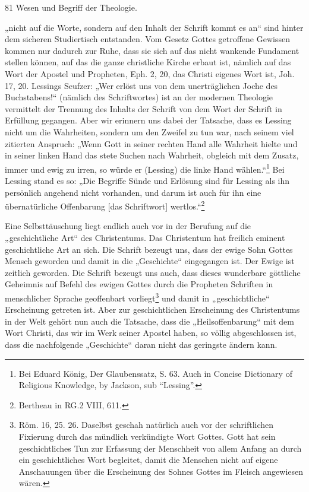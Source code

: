 81 Wesen und Begriff der Theologie.\par „nicht auf die Worte, sondern auf den Inhalt der Schrift kommt es an“ sind hinter dem sicheren Studiertisch entstanden. Vom Gesetz Gottes getroffene Gewissen kommen nur dadurch zur Ruhe, dass sie sich auf das nicht wankende Fundament stellen können, auf das die ganze christliche Kirche erbaut ist, nämlich auf das Wort der Apostel und Propheten, Eph. 2, 20, das Christi eigenes Wort ist, Joh. 17, 20. Lessings Seufzer: „Wer erlöst uns von dem unerträglichen Joche des Buchstabens!“ (nämlich des Schriftwortes) ist an der modernen Theologie vermittelt der Trennung des Inhalts der Schrift von dem Wort der Schrift in Erfüllung gegangen. Aber wir erinnern uns dabei der Tatsache, dass es Lessing nicht um die Wahrheiten, sondern um den Zweifel zu tun war, nach seinem viel zitierten Anspruch: „Wenn Gott in seiner rechten Hand alle Wahrheit hielte und in seiner linken Hand das stete Suchen nach Wahrheit, obgleich mit dem Zusatz, immer und ewig zu irren, so würde er (Lessing) die linke Hand wählen.“\footnote[267]{Bei Eduard König, Der Glaubenssatz, S. 63. Auch in Concise Dictionary of Religious Knowledge, by Jackson, sub “Lessing”.} Bei Lessing stand es so: „Die Begriffe Sünde und Erlösung sind für Lessing als ihn persönlich angehend nicht vorhanden, und darum ist auch für ihn eine übernatürliche Offenbarung [das Schriftwort] wertlos.“\footnote[268]{Bertheau in RG.2 VIII, 611.}\par Eine Selbsttäuschung liegt endlich auch vor in der Berufung auf die „geschichtliche Art“ des Christentums. Das Christentum hat freilich eminent geschichtliche Art an sich. Die Schrift bezeugt uns, dass der ewige Sohn Gottes Mensch geworden und damit in die „Geschichte“ eingegangen ist. Der Ewige ist zeitlich geworden. Die Schrift bezeugt uns auch, dass dieses wunderbare göttliche Geheimnis auf Befehl des ewigen Gottes durch die Propheten Schriften in menschlicher Sprache geoffenbart vorliegt\footnote[269]{Röm. 16, 25. 26. Daselbst geschah natürlich auch vor der schriftlichen Fixierung durch das mündlich verkündigte Wort Gottes. Gott hat sein geschichtliches Tun zur Erfassung der Menschheit von allem Anfang an durch ein geschichtliches Wort begleitet, damit die Menschen nicht auf eigene Anschauungen über die Erscheinung des Sohnes Gottes im Fleisch angewiesen wären.} und damit in „geschichtliche“ Erscheinung getreten ist. Aber zur geschichtlichen Erscheinung des Christentums in der Welt gehört nun auch die Tatsache, dass die „Heilsoffenbarung“ mit dem Wort Christi, das wir im Werk seiner Apostel haben, so völlig abgeschlossen ist, dass die nachfolgende „Geschichte“ daran nicht das geringste ändern kann.